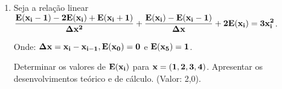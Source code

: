 \documentclass[12pt,a4paper]{article}
\begin{document}
\begin{enumerate}
\item Seja a relação linear
$\displaystyle \bf
\frac
{
	E(x_i-1) - 
    2E(x_i) + 
    E(x_i+1)
}
{
	\Delta x^2
}
+ 
\frac
{
    E(x_i)-E(x_i-1)
}
{
    \Delta x 
}
+  2E(x_i) = 3x_i^2
$.


Onde: $\displaystyle \bf \Delta x = x_i - x_{i-1}, E(x_0) = 0 $ e $\displaystyle \bf E(x_5) = 1 $.

Determinar os valores de $\displaystyle \bf E(x_i)$ para 
$\displaystyle \bf x = (1, 2, 3, 4)$. 
Apresentar os desenvolvimentos teórico e de cálculo. (Valor: 2,0).

\end{enumerate}
\end{document}
